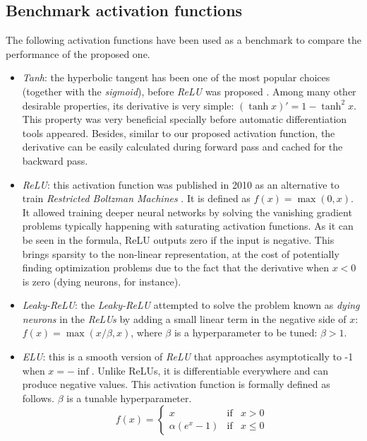 \subsection{Benchmark activation functions}
The following activation functions have been used as a benchmark to compare the performance of the proposed one.


\begin{itemize}
	\item \textit{Tanh}: the hyperbolic tangent has been one of the most popular choices (together with the \textit{sigmoid}), before \textit{ReLU} was proposed \cite{lecun2012}. Among many other desirable properties, its derivative is very simple: $(\tanh x)'=1-\tanh^2 x$. This property was very beneficial specially before automatic differentiation tools appeared. Besides, similar to our proposed activation function, the derivative can be easily calculated during forward pass and cached for the backward pass.
	\item \textit{ReLU}: this activation function was published in 2010 as an alternative to train \textit{Restricted Boltzman Machines} \cite{nair2010}. It is defined as $f(x) = \max(0,x)$. It allowed training deeper neural networks by solving the vanishing gradient problems typically happening with saturating activation functions. As it can be seen in the formula, ReLU outputs zero if the input is negative. This brings sparsity to the non-linear representation, at the cost of potentially finding optimization problems due to the fact that the derivative when $x<0$ is zero (dying neurons, for instance).
	\item \textit{Leaky-ReLU}: the \textit{Leaky-ReLU} \cite{xu2015} attempted to solve the problem known as \textit{dying neurons} in the \textit{ReLUs} by adding a small linear term in the negative side of $x$: $f(x) = \max(x/\beta, x)$, where $\beta$ is a hyperparameter to be tuned: $\beta>1$.
	\item \textit{ELU}: this is a smooth version of \textit{ReLU} \cite{djork2016} that approaches asymptotically to -1 when $x=-\inf$. Unlike ReLUs, it is differentiable everywhere and can produce negative values. This activation function is formally defined as follows. $\beta$ is a tunable hyperparameter.
	$$
	f(x)= \left\{ \begin{array}{lcc}
		x &   \text{if}  & x > 0 \\
 \alpha(e^x - 1) &  \text{if} & x \leq 0
	\end{array}
	\right.
	$$


\end{itemize}
